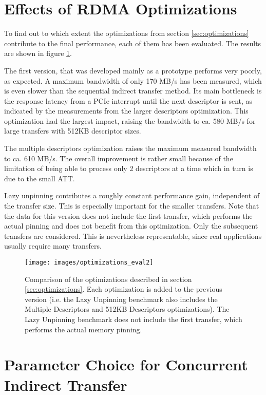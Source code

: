 \section{Effects of RDMA Optimizations} 

To  find out to which extent the optimizations from section \ref{sec:optimizations} contribute to the final performance, each of them has been evaluated.
The results are shown in figure \ref{fig:optimizations_eval}.

The first version, that was developed mainly as a prototype performs very poorly, as expected.
A maximum bandwidth of only 170 MB/s has been measured, which is even slower than the sequential indirect transfer method.
Its main bottleneck is the response latency from a PCIe interrupt until the next descriptor is sent, as indicated by the measurements from the larger descriptors optimization.
This optimization had the largest impact, raising the bandwidth to ca. 580 MB/s for large transfers with 512KB descriptor sizes.


The multiple descriptors optimization raises the maximum measured bandwidth to ca. 610 MB/s.
The overall improvement is rather small because of the limitation of being able to process only 2 descriptors at a time which in turn is due to the small ATT.

Lazy unpinning contributes a roughly constant performance gain, independent of the transfer size.
This is especially important for the smaller transfers.
Note that the data for this version does not include the first transfer, which performs the actual pinning and does not benefit from this optimization.
Only the subsequent transfers are considered.
This is nevertheless representable, since real applications usually require many transfers.

\begin{figure}[htb]
	  \centerline{
		\texttt{[image: images/optimizations\_eval2]}}
	  \caption{Comparison of the optimizations described in section \ref{sec:optimizations}. Each optimization is added to the previous version (i.e. the Lazy Unpinning benchmark also includes the Multiple Descriptors and 512KB Descriptors optimizations). The Lazy Unpinning benchmark does not include the first transfer, which performs the actual memory pinning.}
	  \label{fig:optimizations_eval}
\end{figure}


\section{Parameter Choice for Concurrent Indirect Transfer}
\label{sec:results_concurrent}


